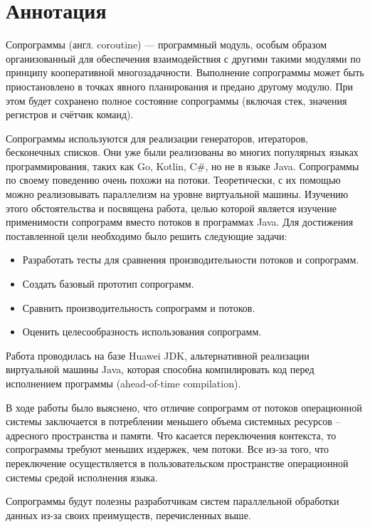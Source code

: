 \section{Аннотация}

Сопрограммы (англ. coroutine) — программный модуль, особым образом организованный для
обеспечения взаимодействия с другими такими модулями по принципу кооперативной
многозадачности\cite{coroutine}. Выполнение сопрограммы может быть
приостановлено в точках явного планирования и предано другому модулю. 
При этом будет сохранено полное состояние сопрограммы (включая стек, значения регистров и счётчик команд). 

\par
Сопрограммы используются для реализации генераторов, итераторов, бесконечных списков. 
Они уже были реализованы во многих популярных языках программирования, таких как Go, Kotlin,
C\#, но не в языке Java. Сопрограммы по своему поведению очень похожи на потоки.
Теоретически, с их помощью можно реализовывать параллелизм на уровне виртуальной машины.
Изучению этого обстоятельства и посвящена работа, целью которой является изучение
применимости сопрограмм вместо потоков в программах Java.
Для достижения поставленной цели необходимо было решить следующие задачи:
\begin{itemize}
	\item Разработать тесты для сравнения производительности потоков и сопрограмм.
	\item Создать базовый прототип сопрограмм.
	\item Сравнить производительность сопрограмм и потоков.
	\item Оценить целесообразность использования сопрограмм.
\end{itemize}
Работа проводилась на базе Huawei JDK, альтернативной реализации виртуальной машины Java, которая способна компилировать код перед исполнением программы (ahead-of-time compilation). 
\par
В ходе работы было выяснено, что отличие сопрограмм от потоков операционной системы
заключается в потреблении меньшего объема системных ресурсов – адресного пространства и
памяти. Что касается переключения контекста, то сопрограммы требуют меньших издержек, чем
потоки. Все из-за того, что переключение осуществляется в пользовательском пространстве
операционной системы средой исполнения языка. 
\par
Сопрограммы будут полезны разработчикам систем параллельной обработки данных из-за своих преимуществ, перечисленных выше.
\clearpage

